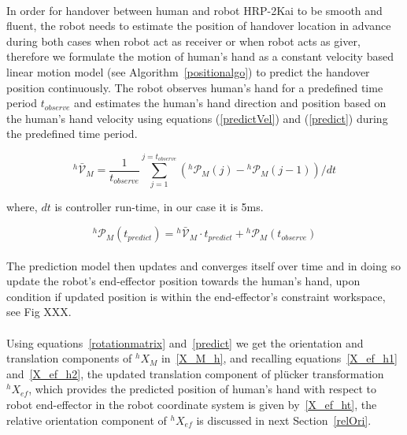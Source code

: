 \documentclass[a4paper, 12pt, oneside]{Thesis}  %
\begin{document}
\paragraph*{}
In order for handover between human and robot HRP-2Kai to be smooth and fluent, the robot needs to estimate the position of handover location in advance during both cases when robot act as receiver or when robot acts as giver, therefore we formulate the motion of human's hand as a constant velocity based linear motion model (see Algorithm~\ref{positionalgo}) to predict the handover position continuously. The robot observes human's hand for a predefined time period $t_{observe}$ and estimates the human's hand direction and position based on the human's hand velocity using equations (\ref{predictVel}) and (\ref{predict}) during the predefined time period. 

\begin{equation} \label{predictVel}
{}^{h}\mathcal{\bar{V}}_{M} = \frac{1}{t_{observe}}{\sum_{j=1}^{j=t_{observe}} ({}^{h}\mathcal{P}_{M}(j)-{}^{h}\mathcal{P}_{M}(j-1))/dt }
\end{equation}

where, $dt$ is controller run-time, in our case it is 5ms.

\begin{equation} \label{predict}
{}^{h}\mathcal{P}_M(t_{predict}) = {}^{h}\mathcal{\bar{V}}_{M} \cdot t_{predict}  + {}^{h}\mathcal{P}_{M}(t_{observe})
\end{equation}

\paragraph*{}
The prediction model then updates and converges itself over time and in doing so update the robot's end-effector position towards the human's hand, upon condition if updated position is within the end-effector's constraint workspace, see Fig XXX.

\paragraph*{}
Using equations~\ref{rotationmatrix} and~\ref{predict} we get the orientation and translation components of ${}^{h}{X}_M$ in~\ref{X_M_h}, and recalling equations~\ref{X_ef_h1} and~\ref{X_ef_h2}, the updated translation component of pl\"ucker transformation ${}^{h}{X}_{ef}$, which provides the predicted position of human's hand with respect to robot end-effector in the robot coordinate system is given by~\ref{X_ef_ht}, the relative orientation component of ${}^{h}{X}_{ef}$ is discussed in next Section~\ref{relOri}.
\end{document}
